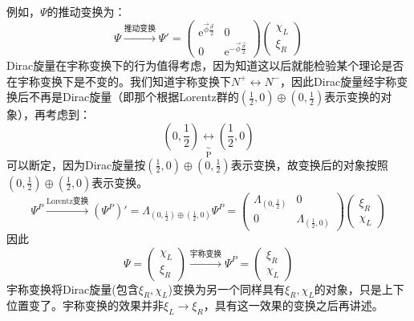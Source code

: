 例如，$\Psi$的推动变换为：
\begin{equation}
\label{equ3.229}
    \Psi \stackrel{\text{推动变换}}{\longrightarrow} \Psi' =
        \begin{pmatrix}
            \mathrm{e}^{\vec{\phi} \frac{\vec{\sigma}}{2}} & 0 \\
            0 & \mathrm{e}^{-\vec{\phi} \frac{\vec{\sigma}}{2}}
        \end{pmatrix}
        \begin{pmatrix}
            \chi_L \\ \xi_R
        \end{pmatrix}
\end{equation}
Dirac旋量在宇称变换下的行为值得考虑，因为知道这以后就能检验某个理论是否在宇称变换下是不变的。我们知道宇称变换下$N^+ \leftrightarrow N^-$，因此Dirac旋量经宇称变换后不再是Dirac旋量（即那个根据Lorentz群的$(\frac{1}{2}, 0) \oplus (0, \frac{1}{2})$表示变换的对象），再考虑到：
\begin{equation}
\label{equ3.230}
    \left( 0, \frac{1}{2} \right) \underbrace{\leftrightarrow}_{\mathrm{P}} \left( \frac{1}{2}, 0 \right)
\end{equation}
可以断定，因为Dirac旋量按$(\frac{1}{2}, 0) \oplus (0, \frac{1}{2})$表示变换，故变换后的对象按照$ (0, \frac{1}{2}) \oplus (\frac{1}{2}, 0)$表示变换。
\begin{equation}
\label{equ3.231}
    \Psi^P \stackrel{\text{Lorentz变换}}{\longrightarrow} (\Psi^P)' = \Lambda_{ (0, \frac{1}{2}) \oplus (\frac{1}{2}, 0)} \Psi^P =
        \begin{pmatrix}
            \Lambda_{(0, \frac{1}{2})} & 0 \\
            0 & \Lambda_{(\frac{1}{2}, 0)}
        \end{pmatrix}
        \begin{pmatrix}
            \xi_R \\ \chi_L
        \end{pmatrix}
\end{equation}
因此
\begin{equation}
\label{equ3.232}
    \Psi =
        \begin{pmatrix}
            \chi_L \\ \xi_R
        \end{pmatrix}
    \stackrel{\text{宇称变换}}{\longrightarrow}
    \Psi^P =
        \begin{pmatrix}
            \xi_R \\ \chi_L
        \end{pmatrix}
\end{equation}
宇称变换将Dirac旋量(包含$\xi_R, \chi_L$)变换为另一个同样具有$\xi_R, \chi_L$的对象，只是上下位置变了。宇称变换的效果并非$\xi_L \rightarrow \xi_R$，具有这一效果的变换之后再讲述。

